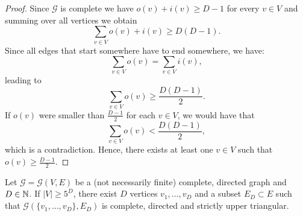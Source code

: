 \begin{proof}
  Since \(\mathcal{G}\) is complete we have \(o(v) + i(v) \geq D - 1\) for every \(v \in V\) and summing over all vertices we obtain
  \[
    \sum_{v \in V} o(v) + i(v) \geq D(D-1).
  \]
  Since all edges that start somewhere have to end somewhere, we have:
  \[
    \sum_{v \in V} o(v) = \sum_{v \in V} i(v),
  \]
  leading to
  \[
    \sum_{v \in V} o(v) \geq \frac{D(D-1)}{2}.
  \]
  If \(o(v)\) were smaller than \(\frac{D-1}{2}\) for each \(v \in V\), we would have that
  \[
    \sum_{v \in V} o(v) < \frac{D(D-1)}{2},
  \]
  which is a contradiction. Hence, there exists at least one \(v \in V\) such that \(o(v) \geq \frac{D-1}{2}\).
\end{proof}

\begin{lemma}[{\cite[Lemma~A.8]{MR3509968}}]
  \label{lem:A.8}
  Let \(\mathcal{G} = \mathcal{G}(V,E)\) be a (not necessarily finite) complete, directed graph and \(D \in \mathbb{N}\). If \(|V| \geq 5^D\), there exist \(D\) vertices \(v_1, \dots, v_D\) and a subset \(E_D \subset E\) such that \(\mathcal{G}(\{v_1, \dots, v_D\}, E_D)\) is complete, directed and strictly upper triangular.
\end{lemma}

